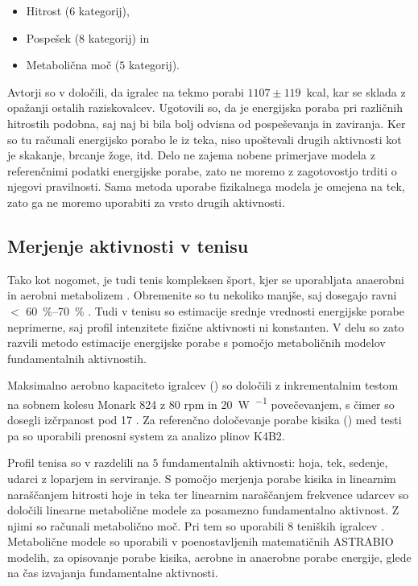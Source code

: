 \begin{itemize}
\item Hitrost ($6$ kategorij),
\item Pospešek ($8$ kategorij) in
\item Metabolična moč ($5$ kategorij).
\end{itemize}

Avtorji so v \cite{osgnach2010energy} določili, da igralec na tekmo porabi $1107 \pm 119$~kcal, kar se sklada z opažanji ostalih raziskovalcev. Ugotovili so, da je energijska poraba pri različnih hitrostih podobna, saj naj bi bila bolj odvisna od pospeševanja in zaviranja. Ker so tu računali energijsko porabo le iz teka, niso upoštevali drugih aktivnosti kot je skakanje, brcanje žoge, itd. Delo ne zajema nobene primerjave modela z referenčnimi podatki energijske porabe, zato ne moremo z zagotovostjo trditi o njegovi pravilnosti. Sama metoda uporabe fizikalnega modela je omejena na tek, zato ga ne moremo uporabiti za vrsto drugih aktivnosti.





\subsection{Merjenje aktivnosti v tenisu}

Tako kot nogomet, je tudi tenis kompleksen šport, kjer se uporabljata anaerobni in aerobni metabolizem \cite{botton2011energy}. Obremenite so tu nekoliko manjše, saj dosegajo ravni $<$ \SI{60}{\%}--\SI{70}{\%} \vomax. Tudi v tenisu so estimacije srednje vrednosti energijske porabe neprimerne, saj profil intenzitete fizične aktivnosti ni konstanten. V delu \cite{botton2011energy} so zato razvili metodo estimacije energijske porabe s pomočjo metaboličnih modelov fundamentalnih aktivnostih. 

Maksimalno aerobno kapaciteto igralcev (\vomax) so določili z inkrementalnim testom na sobnem kolesu Monark 824 z 80 rpm in \SI{20}{W.\min^{-1}} povečevanjem, s čimer so dosegli izčrpanost pod \SI{17}{\min} \cite{botton2011energy}. Za referenčno določevanje porabe kisika (\vo) med testi pa so uporabili prenosni system za analizo plinov K4B2. 

Profil tenisa  so v \cite{botton2011energy} razdelili na $5$ fundamentalnih aktivnosti: hoja, tek, sedenje, udarci z loparjem in serviranje. S pomočjo merjenja porabe kisika in linearnim naraščanjem hitrosti hoje in teka ter linearnim naraščanjem frekvence udarcev so določili linearne metabolične modele za posamezno fundamentalno aktivnost. Z njimi so računali metabolično moč. Pri tem so uporabili $8$ teniških igralcev \cite{botton2011energy}. Metabolične modele so uporabili v poenostavljenih matematičnih ASTRABIO modelih, za opisovanje porabe kisika, aerobne in anaerobne porabe energije, glede na čas izvajanja fundamentalne aktivnosti. 

